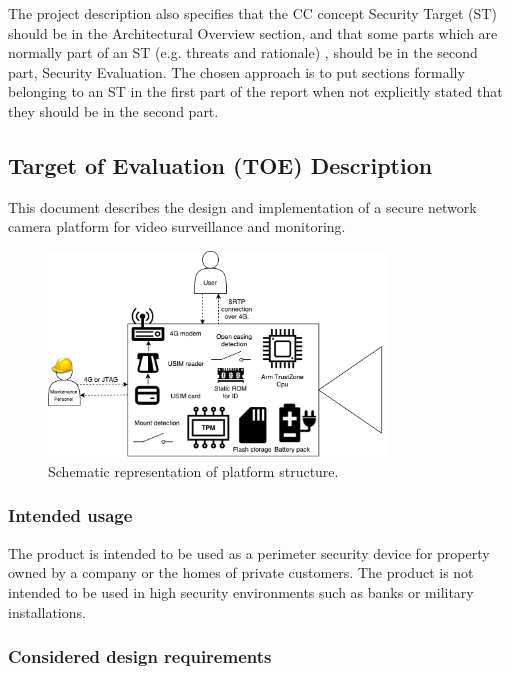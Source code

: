 \documentclass[10pt]{article}
\begin{document}
      { \footnotesize The project description also specifies that the CC concept Security Target (ST)
      should be in the Architectural Overview section, and that some parts
      which are normally part of an ST (e.g. threats and rationale) \cite{stwiki},
      should be in the second part, Security Evaluation. The chosen approach is to
      put sections formally belonging to an ST in the first part of the report when
      not explicitly stated that they should be in the second part.
      }

    \subsection{Target of Evaluation (TOE) Description}

      This document describes the design and implementation of a secure network
      camera platform for video surveillance and monitoring.

      \begin{figure}[!h]
        \center
        \includegraphics[width=0.8\textwidth]{input/platform.pdf}
        \caption{Schematic representation of platform structure.}
      \end{figure}

      \subsubsection{Intended usage}

        The product is intended to be used as a perimeter security device for
        property owned by a company or the homes of private customers. The
        product is not intended to be used in high security environments such
        as banks or military installations.

      \subsubsection{Considered design requirements}
\end{document}
